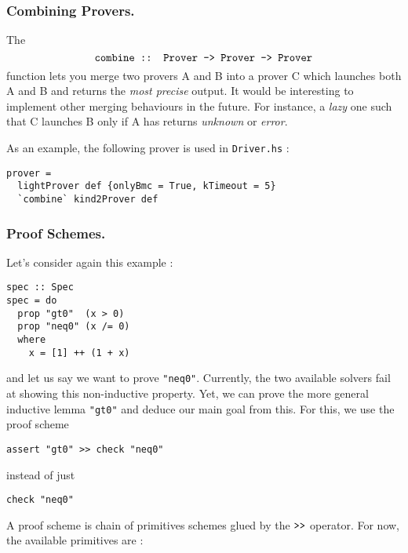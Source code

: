 
\subsubsection{Combining Provers.}\label{combining-provers}

The
$$\texttt{combine :: Prover -\textgreater{} Prover -\textgreater{} Prover}$$
function lets you merge two provers A and B into a prover C which
launches both A and B and returns the \emph{most precise} output. It
would be interesting to implement other merging behaviours in the
future. For instance, a \emph{lazy} one such that C launches B only if A
has returns \emph{unknown} or \emph{error}.

As an example, the following prover is used in \texttt{Driver.hs} :

\begin{lstlisting}[frame=single]
prover =
  lightProver def {onlyBmc = True, kTimeout = 5} 
  `combine` kind2Prover def
\end{lstlisting}


\subsubsection{Proof Schemes.}\label{proof-schemes}

Let's consider again this example :

\begin{lstlisting}[frame=single]
spec :: Spec
spec = do
  prop "gt0"  (x > 0)
  prop "neq0" (x /= 0)
  where
    x = [1] ++ (1 + x)

\end{lstlisting}
and let us say we want to prove \texttt{"neq0"}. Currently, the two
available solvers fail at showing this non-inductive property.  Yet, we can prove the more general
inductive lemma \texttt{"gt0"} and deduce our main goal from this. For
this, we use the proof scheme

\begin{lstlisting}[frame=single]
assert "gt0" >> check "neq0"
\end{lstlisting}


instead of just 
\begin{lstlisting}[frame=single] 
  check "neq0" 
\end{lstlisting}
A proof scheme is chain of
primitives schemes glued by the $\texttt{\textgreater{}\textgreater{}}$
operator. For now, the available primitives are :

